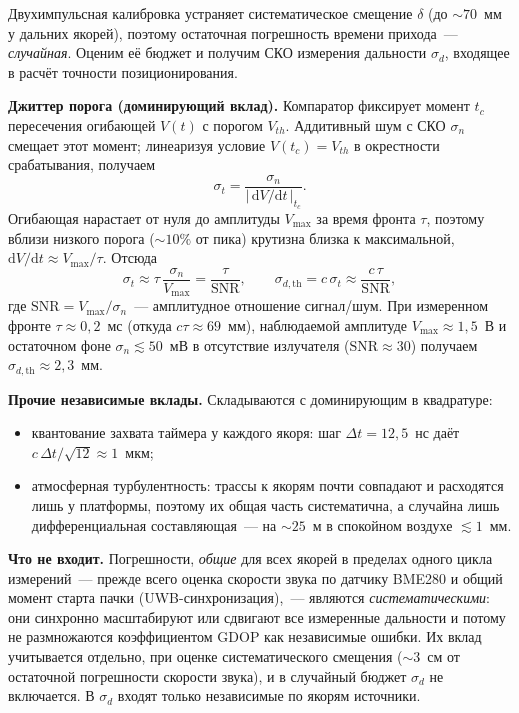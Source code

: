 Двухимпульсная калибровка устраняет систематическое смещение $\delta$ (до ${\sim}70$~мм
у дальних якорей), поэтому остаточная погрешность времени прихода~--- \emph{случайная}.
Оценим её бюджет и получим СКО измерения дальности $\sigma_d$, входящее в расчёт точности
позиционирования.

\textbf{Джиттер порога (доминирующий вклад).} Компаратор фиксирует момент $t_c$ пересечения
огибающей $V(t)$ с порогом $V_{th}$. Аддитивный шум с СКО $\sigma_n$ смещает этот момент;
линеаризуя условие $V(t_c)=V_{th}$ в окрестности срабатывания, получаем
$$
\sigma_t = \frac{\sigma_n}{\left|\,\mathrm{d}V/\mathrm{d}t\,\right|_{t_c}}.
$$
Огибающая нарастает от нуля до амплитуды $V_{\max}$ за время фронта $\tau$, поэтому вблизи
низкого порога (${\sim}10\%$ от пика) крутизна близка к максимальной,
$\mathrm{d}V/\mathrm{d}t \approx V_{\max}/\tau$. Отсюда
$$
\sigma_t \approx \tau\,\frac{\sigma_n}{V_{\max}} = \frac{\tau}{\mathrm{SNR}},
\qquad
\sigma_{d,\mathrm{th}} = c\,\sigma_t \approx \frac{c\,\tau}{\mathrm{SNR}},
$$
где $\mathrm{SNR}=V_{\max}/\sigma_n$~--- амплитудное отношение сигнал/шум. При измеренном
фронте $\tau\approx0{,}2$~мс (откуда $c\tau\approx69$~мм), наблюдаемой амплитуде
$V_{\max}\approx1{,}5$~В и остаточном фоне $\sigma_n\lesssim50$~мВ в отсутствие излучателя
($\mathrm{SNR}\approx30$) получаем $\sigma_{d,\mathrm{th}}\approx2{,}3$~мм.

\textbf{Прочие независимые вклады.} Складываются с доминирующим в квадратуре:
\begin{itemize}
  \item квантование захвата таймера у каждого якоря: шаг $\Delta t=12{,}5$~нс даёт
        $c\,\Delta t/\sqrt{12}\approx1$~мкм;
  \item атмосферная турбулентность: трассы к якорям почти совпадают и расходятся лишь
        у платформы, поэтому их общая часть систематична, а случайна лишь дифференциальная
        составляющая~--- на ${\sim}25$~м в спокойном воздухе $\lesssim1$~мм.
\end{itemize}

\textbf{Что не входит.} Погрешности, \emph{общие} для всех якорей в пределах одного цикла
измерений~--- прежде всего оценка скорости звука по датчику BME280 и общий момент старта
пачки (UWB-синхронизация),~--- являются \emph{систематическими}: они синхронно масштабируют
или сдвигают все измеренные дальности и потому не размножаются коэффициентом GDOP как
независимые ошибки. Их вклад учитывается отдельно, при оценке систематического смещения
(${\sim}3$~см от остаточной погрешности скорости звука), и в случайный бюджет $\sigma_d$
не включается. В $\sigma_d$ входят только независимые по якорям источники.

